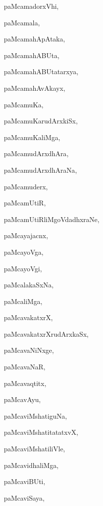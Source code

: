 \begin{multicols}{2}
{paMcamadorxVhi}, \pageref{paMcamadorxVhi}

{paMcamala}, \pageref{paMcamala}

{paMcamahApAtaka}, \pageref{paMcamahApAtaka}

{paMcamahABUta}, \pageref{paMcamahABUta}

{paMcamahABUtatarxya}, \pageref{paMcamahABUtatarxya}

{paMcamahAvAkayx}, \pageref{paMcamahAvAkayx}

{paMcamuKa}, \pageref{paMcamuKa}

{paMcamuKarudArxkiSx}, \pageref{paMcamuKarudArxkiSx}

{paMcamuKaliMga}, \pageref{paMcamuKaliMga}

{paMcamudArxdhAra}, \pageref{paMcamudArxdhAra}

{paMcamudArxdhAraNa}, \pageref{paMcamudArxdhAraNa}

{paMcamuderx}, \pageref{paMcamuderx}

{paMcamUtiR}, \pageref{paMcamUtiR}

{paMcamUtiRliMgoVdadhxraNe}, \pageref{paMcamUtiRliMgoVdadhxraNe}

{paMcayajacnx}, \pageref{paMcayajacnx}

{paMcayoVga}, \pageref{paMcayoVga}

{paMcayoVgi}, \pageref{paMcayoVgi}

{paMcalakaSxNa}, \pageref{paMcalakaSxNa}

{paMcaliMga}, \pageref{paMcaliMga}

{paMcavakatxrX}, \pageref{paMcavakatxrX}

{paMcavakatxrXrudArxkaSx}, \pageref{paMcavakatxrXrudArxkaSx}

{paMcavaNiNxge}, \pageref{paMcavaNiNxge}

{paMcavaNaR}, \pageref{paMcavaNaR}

{paMcavaqtitx}, \pageref{paMcavaqtitx}

{paMcavAyu}, \pageref{paMcavAyu}

{paMcaviMshatiguNa}, \pageref{paMcaviMshatiguNa}

{paMcaviMshatitatatxvX}, \pageref{paMcaviMshatitatatxvX}

{paMcaviMshatiliVle}, \pageref{paMcaviMshatiliVle}

{paMcavidhaliMga}, \pageref{paMcavidhaliMga}

{paMcaviBUti}, \pageref{paMcaviBUti}

{paMcaviSaya}, \pageref{paMcaviSaya}


\end{multicols}
